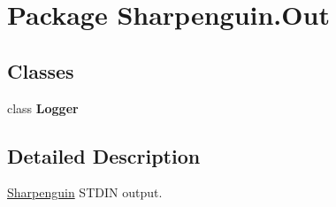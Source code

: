 \hypertarget{namespaceSharpenguin_1_1Out}{\section{\-Package \-Sharpenguin.\-Out}
\label{namespaceSharpenguin_1_1Out}
}
\subsection*{\-Classes}
\begin{DoxyCompactItemize}
\item 
class {\bfseries \-Logger}
\end{DoxyCompactItemize}


\subsection{\-Detailed \-Description}
\hyperlink{namespaceSharpenguin}{\-Sharpenguin} \-S\-T\-D\-I\-N output. 